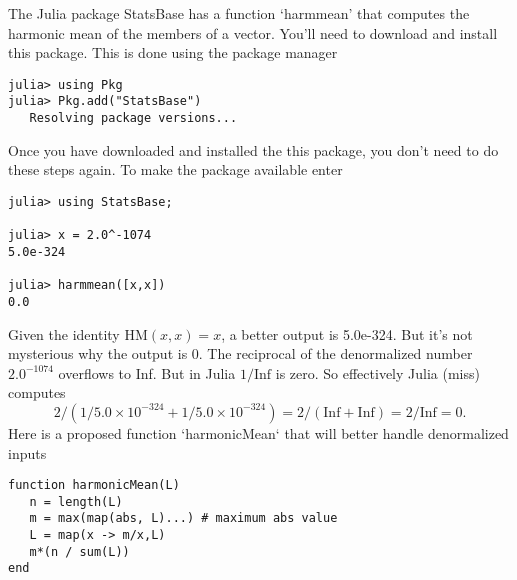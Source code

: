 \documentclass[12pt,fleqn]{exam}
\newcommand{\HM}{\mathrm{HM}}
\newcommand{\Inf}{\mathrm{Inf}}
\begin{document}
The Julia package   StatsBase has a function `harmmean' that computes the harmonic mean of the members
of a vector.  You'll need to download and install this package. This is done using the package manager

\begin{verbatim}
julia> using Pkg
julia> Pkg.add("StatsBase")
   Resolving package versions...
 \end{verbatim}
Once you have downloaded and installed the this package, you don't need to do these steps again. To make the
package available enter

\begin{verbatim}
julia> using StatsBase;

julia> x = 2.0^-1074
5.0e-324

julia> harmmean([x,x])
0.0
\end{verbatim}
Given the identity $  \HM(x,x) =x$, a better output is 5.0e-324. But it's not mysterious why the output is 0.
The reciprocal of the denormalized number $2.0^{-1074}$ overflows to Inf. But in Julia $1/\Inf$ is zero. So effectively Julia (miss) computes 
\begin{equation} 
  2 / (1/{5.0\times 10^{-324}}  + 1/{5.0\times 10^{-324}}) = 2 /(\Inf + \Inf) = 2/\Inf =0.
 \end{equation}
Here is a proposed function `harmonicMean` that will better handle denormalized inputs
\begin{verbatim}
function harmonicMean(L)
   n = length(L)
   m = max(map(abs, L)...) # maximum abs value
   L = map(x -> m/x,L)  
   m*(n / sum(L))
end
\end{verbatim}
\end{document}

